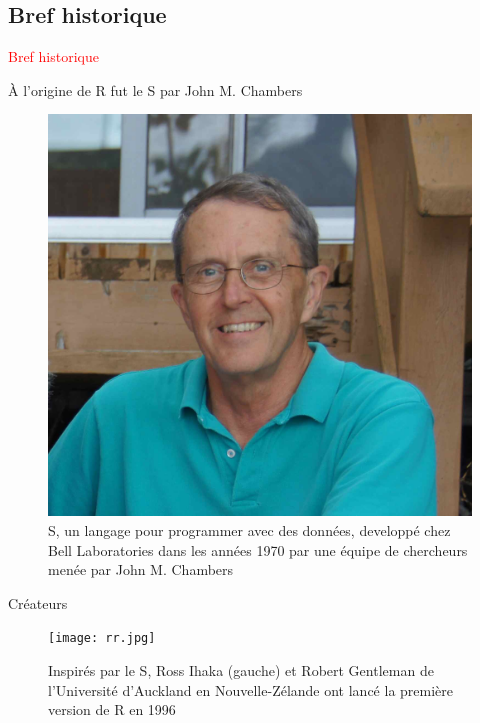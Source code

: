 \documentclass[11pt]{beamer}\usepackage[]{graphicx}\usepackage[]{color}
\begin{document}
\subsection{Bref historique}

\begin{frame}
 \begin{center}
  \Huge{\textcolor{red}{Bref historique}}
 \end{center}
\end{frame}


\begin{frame}{\`{A} l'origine de R fut le S par John M. Chambers}
\begin{center}
\begin{figure}
\includegraphics[scale=0.10]{john.jpg}
\caption{S, un langage pour programmer avec des donn\'{e}es, developp\'{e} chez Bell Laboratories dans les ann\'{e}es 1970 par une \'{e}quipe de chercheurs men\'{e}e par John M. Chambers}
\end{figure}
\end{center}
\end{frame}


\begin{frame}{Cr\'{e}ateurs}
\begin{center}
\begin{figure}
\texttt{[image: rr.jpg]}
\caption{Inspir\'{e}s par le S, Ross Ihaka (gauche) et Robert Gentleman de l'Universit\'{e} d'Auckland en Nouvelle-Z\'{e}lande ont lanc\'{e} la premi\`{e}re version de R en 1996}
\end{figure}
\end{center}
\end{frame}
\end{document}
